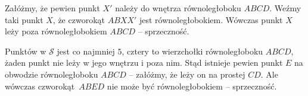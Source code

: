 \begin{center}
\end{center}

\vspace{10px}
\noindent
Załóżmy, że pewien punkt $X'$ należy do wnętrza równoległoboku $ABCD$. Weźmy taki punkt $X$, że czworokąt $ABXX'$ jest równoległobokiem. Wówczas punkt $X$ leży poza równoległobokiem $ABCD$ -- sprzeczność.

\vspace{10px}
\noindent
Punktów w $\mathcal{S}$ jest co najmniej $5$, cztery to wierzchołki równoległoboku $ABCD$, żaden punkt nie leży w jego wnętrzu i poza nim. Stąd istnieje pewien punkt $E$ na obwodzie równoległoboku $ABCD$ -- załóżmy, że leży on na prostej $CD$. Ale wówczas czworokąt~$ABED$ nie może być równoległobokiem -- sprzeczność.
